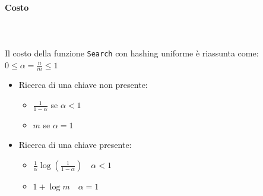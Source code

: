 \paragraph{Costo} \;\\~\\
Il costo della funzione \verb|Search| con hashing uniforme è riassunta come: $0 \leq \alpha = \frac{n}{m} \leq 1$
\begin{itemize}
    \item Ricerca di una chiave non presente:
    \begin{itemize}
        \item $\frac{1}{1-\alpha}$ \quad se $\alpha < 1$
        \item $m$ \quad se $\alpha = 1$
    \end{itemize}
    \item Ricerca di una chiave presente:
    \begin{itemize}
        \item $\frac{1}{\alpha} \log(\frac{1}{1-\alpha}) \quad \alpha<1$
        \item $1 + \log m \quad \alpha=1$
    \end{itemize}
\end{itemize}

\newpage
